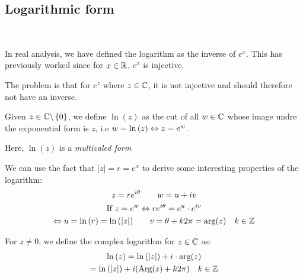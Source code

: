 \subsection{Logarithmic form}\hfill\\\par
\noindent In real analysis, we have defined the logarithm as the inverse of $e^x$. This has previously worked since for $x\in\mathbb{R}$, $e^x$ is injective.\par
\noindent The problem is that for $e^z$ where $z\in\mathbb{C}$, it is not injective and should therefore not have an inverse.
\par\bigskip
\noindent Given $z\in\mathbb{C}\backslash\left\{0\right\}$, we define $\ln{\left(z\right)}$ as the cut of all $w\in\mathbb{C}$ whose image undre the exponential form is $z$, i.e $w = \ln{\left(z\right)}\Leftrightarrow z = e^w$.
\par\bigskip
\noindent Here, $\ln{\left(z\right)}$  is a \textit{multivaled form}
\par\bigskip
\noindent We can use the fact that $\left|z\right| = r = e^x$ to derive some interesting properties of the logarithm:
\begin{equation*}
  \begin{gathered}
    z = re^{i\theta}\qquad w= u+iv\\
    \text{If } z=e^w\Leftrightarrow re^{i\theta} = e^u\cdot e^{iv}\\
    \Leftrightarrow u = \ln{\left(r\right)} = \ln{\left(\left|z\right|\right)}\qquad v = \theta+k2\pi = \text{arg}(z)\quad k\in\mathbb{Z}
  \end{gathered}
\end{equation*}
\newpage
\begin{theo}{}
  For $z\neq0$, we define the complex logarithm for $z\in\mathbb{C}$  as:
  \begin{equation*}
    \begin{gathered}
      \ln{\left(z\right)} = \ln{\left(\left|z\right|\right)}+i\cdot\text{arg}(z)\\
      = \ln{\left(\left|z\right|\right)}+i(\text{Arg}(z)+k2\pi)\quad k\in\mathbb{Z}
    \end{gathered}
  \end{equation*}
\end{theo}
